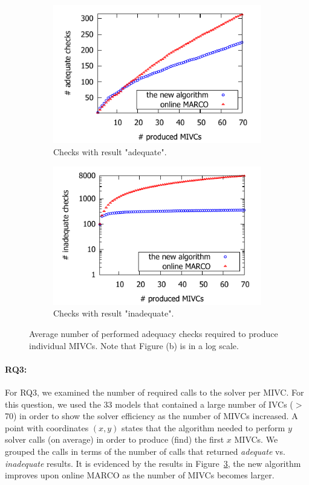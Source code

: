 \begin{figure}[!t]
\centering
\begin{subfigure}{.5\textwidth}
  \centering
  \includegraphics[scale=0.8]{./plots/adequate_checks_per_mivc_70.pdf}
  \caption{Checks with result "adequate".}
  \label{res:adequate_checks}
\end{subfigure}%
\begin{subfigure}{.5\textwidth}
  \centering
  \includegraphics[scale=0.8]{./plots/inadequate_checks_per_mivc_70.pdf}
  \caption{Checks with result "inadequate".}
  \label{res:inadequate_checks}
\end{subfigure}
\caption{Average number of performed adequacy checks required to produce individual MIVCs. Note that Figure (b) is in a log scale.}
\label{res:checks}
\end{figure}

\vspace{-5pt}
\paragraph{RQ3:}  For RQ3, we examined the number of required calls to the solver per MIVC.  For this question, we used the 33 models that contained a large number of IVCs ($>$70) in order to show the solver efficiency as the number of MIVCs increased.  A point with coordinates $(x,y)$ states that the algorithm needed to perform $y$ solver calls (on average) in order to produce (find) the first $x$ MIVCs. We grouped the calls in terms of the number of calls that returned {\em adequate} vs. {\em inadequate} results.  It is evidenced by the results in Figure~\ref{res:checks}, the new algorithm improves upon online MARCO as the number of MIVCs becomes larger.


